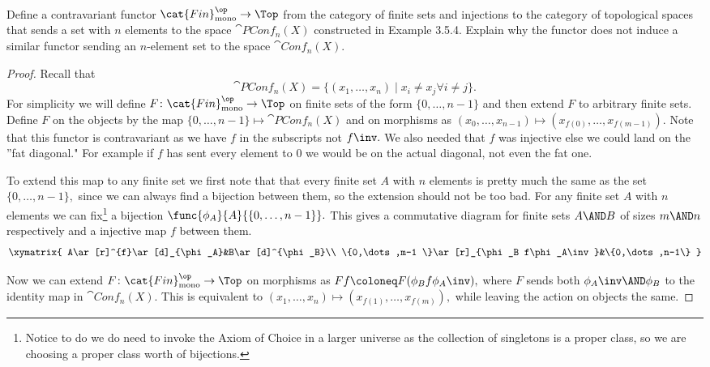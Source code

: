 \documentclass[main.tex]{subfiles}
\begin{document}
	
	\paragraph{}
	\begin{exercise}
		Define a contravariant functor $ \cat{Fin}_{\textrm{mono}}^\op \to
		\Top$ from 
		the	category of finite sets and injections to the category of
		topological 
		spaces that sends a set with $ n $ elements to the space $
		\cat{PConf}_n(X) $ 
		constructed in Example 3.5.4. Explain why the functor does not induce a 
		similar functor sending an $ n $-element set to the space $ \cat{Conf}_n(X). $
	\end{exercise}
	
	\begin{proof}
		Recall that
		$$
		\cat{PConf}_n(X)=\{(x_1,\dots,x_n)\mid x_i\neq x_j \forall i\neq j
		\}.
		$$
		For simplicity we will define $ F\colon\cat{Fin}_{\textrm{mono}}^\op 
		\to \Top $  on finite sets of the form $ \{0,\dots,n-1\} $ and then
		extend $ F $ to arbitrary finite sets. Define $ F $ on the objects by
		the map $\{0,\dots,n-1\}\mapsto \cat{PConf}_n(X)$ and on morphisms as
		$ (x_0,\dots,x_{n-1})\mapsto (x_{f(0)},\dots, x_{f(m-1)}). $ 
		Note that this functor is contravariant as we have $f$ in the 
		subscripts not $f\inv.$ We also needed that $ f $ was injective else we 
		could land on the ''fat diagonal." For example if $ f $ has sent every
		element to $ 0 $ we would be on the actual diagonal, not even the fat
		one.
		
		To extend this map to any finite set we first note that that every 
		finite set $ A $ with $ n $ elements
		is pretty much the same as the set $ \{0,\dots,n-1\}, $
		since we can always find a bijection between them, so the
		extension should not be too bad. For any finite set $ A $ with $ n $ 
		elements we can fix\footnote{Notice to do we do need to invoke the 
		Axiom of Choice in a larger universe as the collection of singletons is 
		a proper class, so we are choosing a proper class worth of 
		bijections.} a bijection $ \func{\phi_A}{A}{\{0,\dots,n-1\}}.$ 
		This gives a commutative diagram for finite sets $ A\AND B $ of
		sizes $ m\AND n $ respectively and a injective
		map $ f $ between them.
		$$
		\xymatrix{
			A\ar[r]^{f}\ar[d]_{\phi_A}&B\ar[d]^{\phi_B}\\
			\{0,\dots,m-1 \}\ar[r]_{\phi_B f\phi_A\inv}&\{0,\dots,n-1\}
		}
		$$
		
		Now we can extend
		$F\colon\cat{Fin}_{\textrm{mono}}^\op 
		\to \Top $ 
		on morphisms as $ Ff\coloneq F(\phi_B f\phi_A\inv),$
		where $ F $ sends both $\phi_A\inv\AND\phi_B $ to the identity map
		in $ \cat{Conf}_n(X). $
		This is equivalent to $ (x_1,\dots,x_n)\mapsto (x_{f(1)},\dots, 
		x_{f(m)}),$ while leaving the action on objects the same. 
		

\end{proof}
\end{document}
